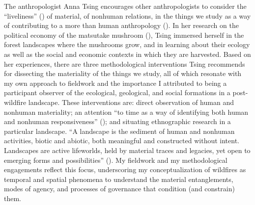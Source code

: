 \documentclass[
]{article}
\begin{document}
The anthropologist Anna Tsing encourages other anthropologists to consider the ``liveliness'' () of material, of nonhuman relations, in the things we study as a way of contributing to a more than human anthropology (). In her research on the political economy of the matsutake mushroom (), Tsing immersed herself in the forest landscapes where the mushrooms grow, and in learning about their ecology as well as the social and economic contexts in which they are harvested. Based on her experiences, there are three methodological interventions Tsing recommends for dissecting the materiality of the things we study, all of which resonate with my own approach to fieldwork and the importance I attributed to being a participant observer of the ecological, geological, and social formations in a post-wildfire landscape. These interventions are: direct observation of human and nonhuman materiality; an attention ``to time as a way of identifying both human and nonhuman responsiveness'' (); and situating ethnographic research in a particular landscape. ``A landscape is the sediment of human and nonhuman activities, biotic and abiotic, both meaningful and constructed without intent. Landscapes are active lifeworlds, held by material traces and legacies, yet open to emerging forms and possibilities'' (). My fieldwork and my methodological engagements reflect this focus, underscoring my conceptualization of wildfires as temporal and spatial phenomena to understand the material entanglements, modes of agency, and processes of governance that condition (and constrain) them.
\end{document}
